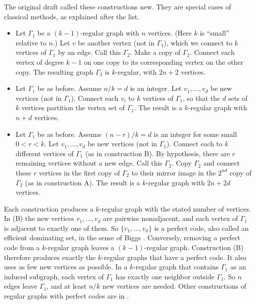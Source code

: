 \documentclass[12pt,letterpaper]{article}
\theoremstyle{definition}
\begin{document}
The original draft called these constructions new. They are special
cases of classical methods, as explained after the list.


\begin{itemize}
\item[(A)]
Let $\Gamma_1$ be a $(k-1)$-regular graph with $n$ vertices. (Here $k$ is
``small'' relative to $n$.) Let $v$ be another vertex (not in $\Gamma_1$),
which we connect to $k$ vertices of $\Gamma_1$ by an edge. Call this
$\Gamma_2$. Make a copy of $\Gamma_2$. Connect each vertex of degree $k-1$
on one copy to its corresponding vertex on the other copy.
The resulting graph $\Gamma_3$ is
$k$-regular, with $2n+2$ vertices.

\item[(B)] Let $\Gamma_1$ be as before. Assume $n/k=d$ is an integer.
Let $v_1, \dots, v_d$ be new vertices (not in $\Gamma_1$).
Connect each $v_i$ to $k$ vertices of
$\Gamma_1$, so that the $d$ sets of $k$ vertices partition the vertex set of
$\Gamma_1$. The result is a $k$-regular graph with $n+d$ vertices.

\item[(C)] Let $\Gamma_1$ be as before. Assume $(n-r)/k=d$ is an integer
for some small $0<r<k$.
Let $v_1, \dots, v_d$ be new vertices (not in $\Gamma_1$). Connect each to $k$ different
vertices of $\Gamma_1$ (as in construction B). By hypothesis, there are $r$
remaining vertices without a new edge. Call this $\Gamma_2$.
Copy $\Gamma_2$ and connect these $r$ vertices in the first copy of $\Gamma_2$
to their mirror image in the $2^{nd}$ copy of $\Gamma_2$ (as in construction
A). The result is a $k$-regular graph with $2n+2d$ vertices. 
  
\end{itemize}

Each construction produces a $k$-regular graph with the stated number of
vertices. In (B) the new vertices $v_1,\dots,v_d$ are pairwise nonadjacent,
and each vertex of $\Gamma_1$ is adjacent to exactly one of them. So
$\{v_1,\dots,v_d\}$ is a perfect code, also called an efficient dominating
set, in the sense of Biggs \cite{Bi73}. Conversely, removing a perfect code
from a $k$-regular graph leaves a $(k-1)$-regular graph. Construction (B)
therefore produces exactly the $k$-regular graphs that have a perfect code.
It also uses as few new vertices as possible. In a $k$-regular graph that
contains $\Gamma_1$ as an induced subgraph, each vertex of $\Gamma_1$ has
exactly one neighbor outside $\Gamma_1$. So $n$ edges leave $\Gamma_1$, and at
least $n/k$ new vertices are needed. Other constructions of regular graphs
with perfect codes are in \cite{Dv88}.
\end{document}
